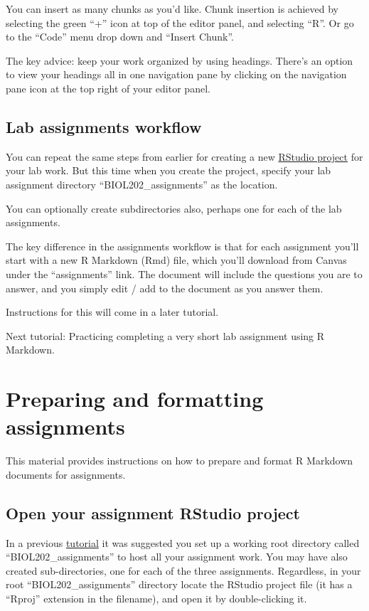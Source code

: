 \documentclass[
]{book}
\begin{document}
You can insert as many chunks as you'd like. Chunk insertion is achieved by selecting the green ``+'' icon at top of the editor panel, and selecting ``R''. Or go to the ``Code'' menu drop down and ``Insert Chunk''.

The key advice: keep your work organized by using headings. There's an option to view your headings all in one navigation pane by clicking on the navigation pane icon at the top right of your editor panel.

\section{Lab assignments workflow}\label{assign_workflow}

You can repeat the same steps from earlier for creating a new \hyperref[create_project]{RStudio project} for your lab work. But this time when you create the project, specify your lab assignment directory ``BIOL202\_assignments'' as the location.

You can optionally create subdirectories also, perhaps one for each of the lab assignments.

The key difference in the assignments workflow is that for each assignment you'll start with a new R Markdown (Rmd) file, which you'll download from Canvas under the ``assignments'' link. The document will include the questions you are to answer, and you simply edit / add to the document as you answer them.

Instructions for this will come in a later tutorial.

Next tutorial: Practicing completing a very short lab assignment using R Markdown.

\chapter{Preparing and formatting assignments}\label{prepare_assignments}

This material provides instructions on how to prepare and format R Markdown documents for assignments.

\section{Open your assignment RStudio project}\label{open_assign_project1}

In a previous \hyperref[assign_workflow]{tutorial} it was suggested you set up a working root directory called ``BIOL202\_assignments'' to host all your assignment work. You may have also created sub-directories, one for each of the three assignments. Regardless, in your root ``BIOL202\_assignments'' directory locate the RStudio project file (it has a ``Rproj'' extension in the filename), and open it by double-clicking it.
\end{document}
